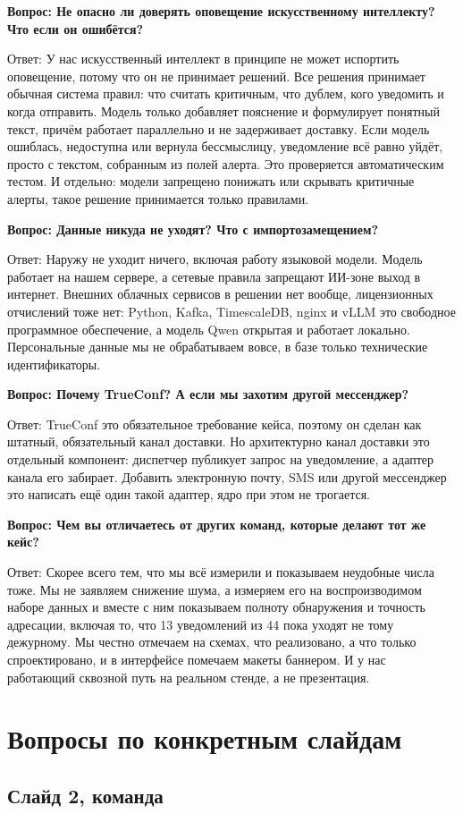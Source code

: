 \documentclass[11pt]{article}
\newcommand{\qa}[2]{%
\par\vspace{7pt}%
{\bfseries Вопрос: #1}\par\vspace{2pt}
{Ответ: #2}\par\vspace{4pt}}
\begin{document}
\qa{Не опасно ли доверять оповещение искусственному интеллекту? Что если он
ошибётся?}
{У нас искусственный интеллект в принципе не может испортить оповещение,
потому что он не принимает решений. Все решения принимает обычная система
правил: что считать критичным, что дублем, кого уведомить и когда отправить.
Модель только добавляет пояснение и формулирует понятный текст, причём
работает параллельно и не задерживает доставку. Если модель ошиблась,
недоступна или вернула бессмыслицу, уведомление всё равно уйдёт, просто с
текстом, собранным из полей алерта. Это проверяется автоматическим тестом.
И отдельно: модели запрещено понижать или скрывать критичные алерты, такое
решение принимается только правилами.}

\qa{Данные никуда не уходят? Что с импортозамещением?}
{Наружу не уходит ничего, включая работу языковой модели. Модель работает на
нашем сервере, а сетевые правила запрещают ИИ-зоне выход в интернет. Внешних
облачных сервисов в решении нет вообще, лицензионных отчислений тоже нет:
Python, Kafka, TimescaleDB, nginx и vLLM это свободное программное
обеспечение, а модель Qwen открытая и работает локально. Персональные данные
мы не обрабатываем вовсе, в базе только технические идентификаторы.}

\qa{Почему TrueConf? А если мы захотим другой мессенджер?}
{TrueConf это обязательное требование кейса, поэтому он сделан как штатный,
обязательный канал доставки. Но архитектурно канал доставки это отдельный
компонент: диспетчер публикует запрос на уведомление, а адаптер канала его
забирает. Добавить электронную почту, SMS или другой мессенджер это написать
ещё один такой адаптер, ядро при этом не трогается.}

\qa{Чем вы отличаетесь от других команд, которые делают тот же кейс?}
{Скорее всего тем, что мы всё измерили и показываем неудобные числа тоже.
Мы не заявляем снижение шума, а измеряем его на воспроизводимом наборе
данных и вместе с ним показываем полноту обнаружения и точность адресации,
включая то, что 13 уведомлений из 44 пока уходят не тому дежурному. Мы честно
отмечаем на схемах, что реализовано, а что только спроектировано, и в
интерфейсе помечаем макеты баннером. И у нас работающий сквозной путь на
реальном стенде, а не презентация.}

\section{Вопросы по конкретным слайдам}

\subsection{Слайд 2, команда}
\end{document}
